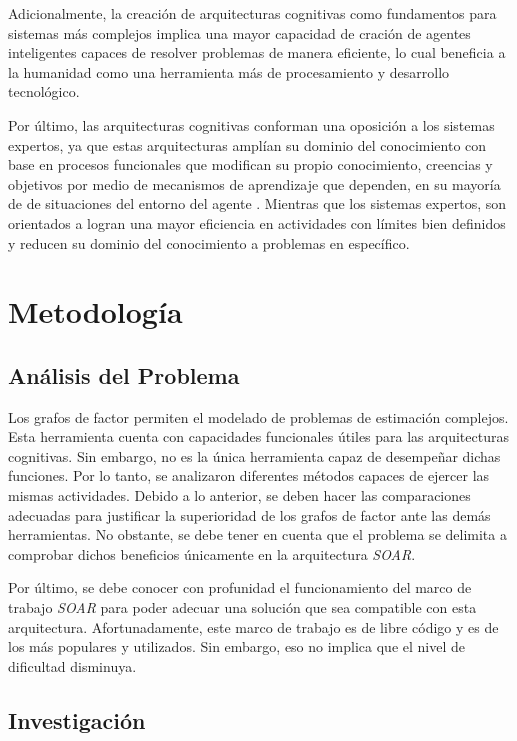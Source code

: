  Adicionalmente, la creaci\'{o}n de arquitecturas cognitivas como fundamentos para sistemas m\'{a}s complejos implica una mayor capacidad de craci\'{o}n de agentes inteligentes capaces de resolver problemas de manera eficiente, lo cual beneficia a la humanidad como una herramienta m\'{a}s de procesamiento y desarrollo tecnol\'{o}gico.
 
 Por \'{u}ltimo, las arquitecturas cognitivas conforman una oposici\'{o}n a los sistemas expertos, ya que estas arquitecturas ampl\'{i}an su dominio del conocimiento con base en procesos funcionales que modifican su propio conocimiento, creencias y objetivos por medio de mecanismos de aprendizaje que dependen, en su mayor\'{i}a de de situaciones del entorno del agente \cite{langley2009cognitive}. Mientras que los sistemas expertos, son orientados a logran una mayor eficiencia en actividades con l\'{i}mites bien definidos y reducen su dominio del conocimiento a problemas en espec\'{i}fico.
 
 \section{Metodolog\'{i}a}
 \subsection{An\'{a}lisis del Problema}
 
Los grafos de factor permiten el modelado de problemas de estimaci\'{o}n complejos. Esta herramienta cuenta con capacidades funcionales \'{u}tiles para las arquitecturas cognitivas. Sin embargo, no es la \'{u}nica herramienta capaz de desempe\~nar dichas funciones. Por lo tanto, se analizaron diferentes m\'{e}todos capaces de ejercer las mismas actividades. Debido a lo anterior, se deben hacer las comparaciones adecuadas para justificar la superioridad de los grafos de factor ante las dem\'{a}s herramientas. No obstante, se debe tener en cuenta que el problema se delimita a comprobar dichos beneficios \'{u}nicamente en la arquitectura \emph{SOAR}.

Por \'{u}ltimo, se debe conocer con profunidad el funcionamiento del marco de trabajo \emph{SOAR} para poder adecuar una soluci\'{o}n que sea compatible con esta arquitectura. Afortunadamente, este marco de trabajo es de libre c\'{o}digo y es de los m\'{a}s populares y utilizados. Sin embargo, eso no implica que el nivel de dificultad disminuya.
 
 
 \subsection{Investigaci\'{o}n}
 
